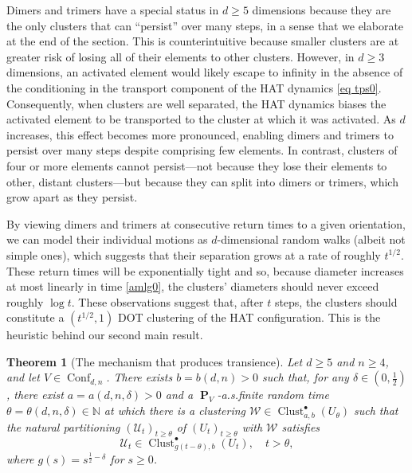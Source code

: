 \documentclass[11pt,reqno]{amsart}
\newtheorem{theorem}{Theorem}
\theoremstyle{definition}
\numberwithin{equation}{section}
\newcommand{\N}{\mathbb{N}}
\newcommand{\1}{\mathbf{1}}
\DeclareMathOperator{\PP}{\mathbf{P}}
\newcommand{\UU}{\mathcal{U}}
\DeclareMathOperator{\Conf}{\mathrm{Conf}}
\DeclareMathOperator{\Clust}{\mathrm{Clust}}
\begin{document}
Dimers and trimers have a special status in $d \geq 5$ dimensions because they are the only clusters that can ``persist'' over many steps, in a sense that we elaborate at the end of the section. This is counterintuitive because smaller clusters are at greater risk of losing all of their elements to other clusters. However, in $d \geq 3$ dimensions, an activated element would likely escape to infinity in the absence of the conditioning in the transport component of the HAT dynamics \eqref{eq tps0}. Consequently, when clusters are well separated, the HAT dynamics biases the activated element to be transported to the cluster at which it was activated. As $d$ increases, this effect becomes more pronounced, enabling dimers and trimers to persist over many steps despite comprising few elements. In contrast, clusters of four or more elements cannot persist---not because they lose their elements to other, distant clusters---but because they can split into dimers or trimers, which grow apart as they persist.

By viewing dimers and trimers at consecutive return times to a given orientation, we can model their individual motions as $d$-dimensional random walks (albeit not simple ones), which suggests that their separation grows at a rate of roughly $t^{1/2}$. These return times will be exponentially tight and so, because diameter increases at most linearly in time \eqref{amlg0}, the clusters' diameters should never exceed roughly $\log t$. These observations suggest that, after $t$ steps, the clusters should constitute a $(t^{1/2}, 1)$ DOT clustering of the HAT configuration. This is the heuristic behind our second main result.

\begin{theorem}[The mechanism that produces transience]\label{fate}
Let $d \geq 5$ and $n \geq 4$, and let $V \in \Conf_{d,n}$. There exists $b = b(d,n) > 0$ such that, for any $\delta \in (0,\frac12)$, there exist $a = a(d,n,\delta) > 0$ and a $\PP_V$-a.s.\@ finite random time $\theta = \theta (d,n,\delta) \in \N$
 at which there is a clustering $\mathcal{W} \in \Clust_{a,b}^\bullet (U_\theta)$ such that the natural partitioning $(\UU_t)_{t \geq \theta}$ of $(U_t)_{t \geq \theta}$ with $\mathcal{W}$ satisfies 
\begin{equation}\label{dot conds}
\UU_t \in \Clust_{g(t-\theta),b}^\bullet (U_t), \quad t > \theta,
\end{equation}
where $g(s) = s^{\frac12 - \delta}$ for $s \geq 0$.
\end{theorem}
\end{document}
